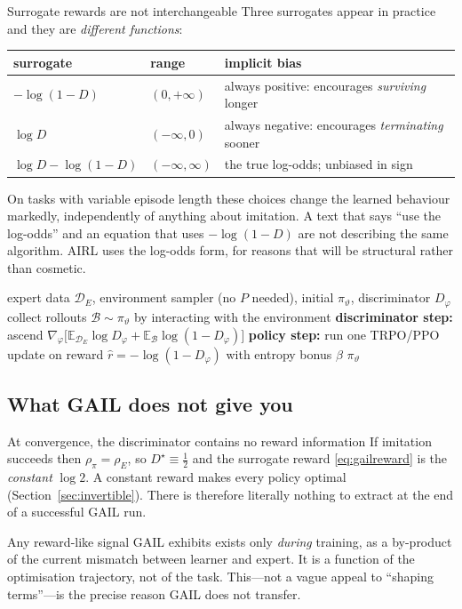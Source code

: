 \documentclass[11pt]{article}
\theoremstyle{plain}
\theoremstyle{definition}
\theoremstyle{remark}
\newcommand{\E}{\mathbb{E}}
\begin{document}
\begin{redbox}{Surrogate rewards are not interchangeable}
Three surrogates appear in practice and they are \emph{different
functions}:
\begin{center}
\begin{tabular}{@{}lll@{}}
\toprule
\textbf{surrogate} & \textbf{range} & \textbf{implicit bias}\\
\midrule
$-\log(1-D)$ & $(0,+\infty)$ & always positive: encourages
\emph{surviving} longer\\
$\log D$ & $(-\infty,0)$ & always negative: encourages \emph{terminating}
sooner\\
$\log D - \log(1-D)$ & $(-\infty,\infty)$ & the true log-odds; unbiased in
sign\\
\bottomrule
\end{tabular}
\end{center}
On tasks with variable episode length these choices change the learned
behaviour markedly, independently of anything about imitation. A text that
says ``use the log-odds'' and an equation that uses $-\log(1-D)$ are not
describing the same algorithm. AIRL uses the log-odds form, for reasons
that will be structural rather than cosmetic.
\end{redbox}

\begin{algorithm}[H]
\caption{GAIL (Ho \& Ermon, 2016)}
\begin{algorithmic}[1]
\Require expert data $\mathcal{D}_E$, environment sampler (no $P$
needed), initial $\pi_\vartheta$, discriminator $D_\varphi$
  \State collect rollouts $\mathcal{B}\sim\pi_\vartheta$ by interacting
  with the environment
  \State \textbf{discriminator step:} ascend $\nabla_\varphi\big[
  \E_{\mathcal{D}_E}\log D_\varphi + \E_{\mathcal{B}}\log(1-D_\varphi)\big]$
  \State \textbf{policy step:} run one TRPO/PPO update on reward $\hat r =
  -\log(1-D_\varphi)$ with entropy bonus $\beta$
\EndFor
\State \Return $\pi_\vartheta$
\end{algorithmic}
\label{alg:gail}
\end{algorithm}

\subsection{What GAIL does not give you}

\begin{redbox}{At convergence, the discriminator contains no reward
information}
If imitation succeeds then $\rho_\pi=\rho_E$, so $D^\star\equiv\frac12$ and
the surrogate reward \eqref{eq:gailreward} is the \emph{constant} $\log2$.
A constant reward makes every policy optimal
(Section~\ref{sec:invertible}). There is therefore literally nothing to
extract at the end of a successful GAIL run.

Any reward-like signal GAIL exhibits exists only \emph{during} training,
as a by-product of the current mismatch between learner and expert. It is
a function of the optimisation trajectory, not of the task.
This---not a vague appeal to ``shaping terms''---is the precise reason
GAIL does not transfer.
\end{redbox}
\end{document}
